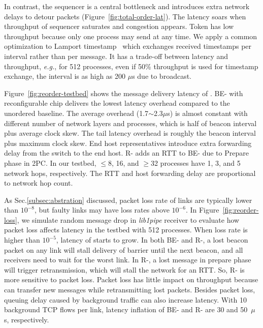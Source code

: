 In contrast, the sequencer is a central bottleneck and introduces extra network delays to detour packets (Figure~\ref{fig:total-order-lat}).
The latency soars when throughput of sequencer saturates and congestion appears.
Token has low throughput because only one process may send at any time.
We apply a common optimization to Lamport timestamp~\cite{lamport1978time} which exchanges received timestamps per interval rather than per message.
It has a trade-off between latency and throughput, \textit{e.g.}, for 512 processes, even if 50\% throughput is used for timestamp exchange, the interval is as high as 200 $\mu$s due to broadcast.





Figure~\ref{fig:reorder-testbed} shows the message delivery latency of \sys{}.
BE-\sys{} with reconfigurable chip delivers the lowest latency overhead compared to the unordered baseline. The average overhead (1.7$\sim$2.3$\mu$s) is almost constant with different number of network layers and processes, which is half of beacon interval plus average clock skew. The tail latency overhead  is roughly the beacon interval plus maximum clock skew.
End host representatives introduce extra forwarding delay from the switch to the end host.
R-\sys{} adds an RTT to BE-\sys{} due to Prepare phase in 2PC.
In our testbed, $\le$8, 16, and $\ge$32 processes have 1, 3, and 5 network hops, respectively.
The RTT and host forwarding delay are proportional to network hop count.

As Sec.\ref{subsec:abstration} discussed, packet loss rate of links are typically lower than $10^{-8}$, but faulty links may have loss rates above $10^{-6}$.
In Figure~\ref{fig:reorder-loss}, we simulate random message drop in \textit{lib1pipe} receiver to evaluate how packet loss affects latency in the testbed with 512 processes.
When loss rate is higher than $10^{-5}$, latency of \sys{} starts to grow. In both BE- and R-\sys{}, a lost beacon packet on any link will stall delivery of barrier until the next beacon, and all receivers need to wait for the worst link. In R-\sys{}, a lost message in prepare phase will trigger retransmission, which will stall the network for an RTT. So, R-\sys{} is more sensitive to packet loss.
Packet loss has little impact on throughput because \sys{} can transfer new messages while retransmitting lost packets.
Besides packet loss, queuing delay caused by background traffic can also increase \sys{} latency. With 10 background TCP flows per link, latency inflation of BE-\sys{} and R-\sys{} are 30 and 50~$\mu$s, respectively.

